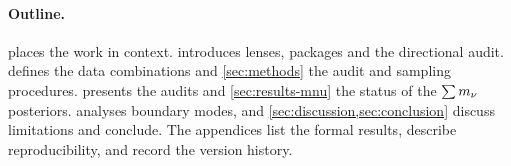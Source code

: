 \paragraph{Outline.}
 places the work in context.  introduces lenses, packages and the directional audit.  defines the data combinations and \cref{sec:methods} the audit and sampling procedures.  presents the audits and \cref{sec:results-mnu} the status of the $\sum m_\nu$ posteriors.  analyses boundary modes, and \cref{sec:discussion,sec:conclusion} discuss limitations and conclude. The appendices list the formal results, describe reproducibility, and record the version history.
